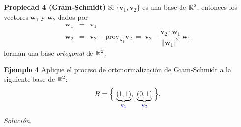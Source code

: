 
\subsection{}

\begin{frame}%

\begin{prop}{\textbf{Propiedad 4 (Gram-Schmidt)}}
	\justifying
	Si $\{\mathbf{v}_1, \mathbf{v}_2\}$ es una base de $\mathbb{R}^2$, entonces los vectores $\mathbf{w}_1$ y $\mathbf{w}_2$ dados por
	\[
	\begin{array}{rcl}
	\mathbf{w}_1 & = & \mathbf{v}_1 \\
	\mathbf{w}_2 & = & \mathbf{v}_2 - \text{proy}_{\mathbf{w}_1} \mathbf{v}_2 \ = \ \mathbf{v}_2 - 
	\dfrac{\mathbf{v}_2\cdot \mathbf{w}_1}{\Vert \mathbf{w}_1 \Vert^2}\ \mathbf{w}_1
	\end{array}
	\]
	forman una base \textit{ortogonal} de $\mathbb{R}^2$.
\end{prop}	

\begin{ej}{\textbf{Ejemplo 4}}\justifying 
	Aplique el proceso de ortonormalización de Gram-Schmidt a la siguiente base de $\mathbb{R}^2$:
	\[
	B = \Big\{ \, \underbrace{(1,1)}_{\color{blue}\mathbf{v}_1}, \ \underbrace{(0,1)}_{\color{blue}\mathbf{v}_2} \, \Big\},
	\]
\end{ej}
\textit{Solución}.

\end{frame}


\subsection{}

